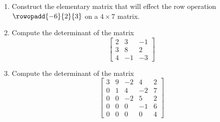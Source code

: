 \begin{enumerate}
%
\item Construct the elementary matrix that will effect the row operation $\rowopadd{-6}{2}{3}$ on a $4\times 7$ matrix.
%
\item Compute the determinant of the matrix
%
\begin{equation*}
\begin{bmatrix}
2&3&-1\\
3&8&2\\
4&-1&-3
\end{bmatrix}
\end{equation*}
%
\item Compute the determinant of the matrix
%
\begin{equation*}
\begin{bmatrix}
3 & 9 & -2 & 4 & 2 \\
0 & 1 & 4 & -2 & 7 \\
0 & 0 & -2 & 5 & 2 \\
0 & 0 & 0  & -1 & 6 \\
0 & 0 & 0  & 0 & 4 
\end{bmatrix}
\end{equation*}
%
\end{enumerate}